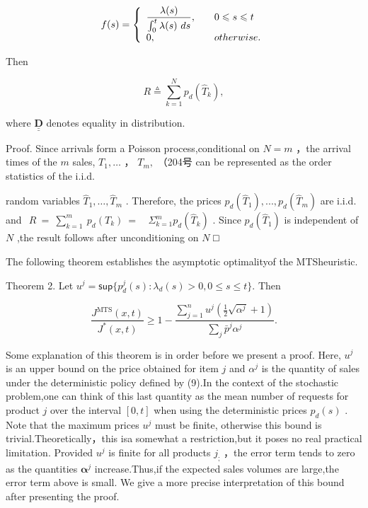 \[
f ( s ) = \left\{ \begin{array} { l l } { \displaystyle \frac { \lambda ( s ) } { \int _ { 0 } ^ { t } \lambda ( s ) ~ d s } , \quad } & { 0 \leqslant s \leqslant t } \\ { 0 , \quad } & { o t h e r w i s e . } \end{array} \right.
\]

Then

\[
R \overset { \vartriangle } { = } \sum _ { k = 1 } ^ { N } p _ { d } ( \hat { T } _ { k } ) ,
\]

where \(\underline { { \underline { { \mathbf { D } } } } }\) denotes
equality in distribution.

Proof. Since arrivals form a Poisson process,conditional on \(N = m\)
，the arrival times of the \(m\) sales, \(T _ { 1 } , \dots\) ，
\(T _ { m } ,\) （204号 can be represented as the order statistics of
the i.i.d.

random variables \(\hat { T } _ { 1 } , \dots , \hat { T } _ { m }\) .
Therefore, the prices
\(p _ { d } ( \hat { T } _ { 1 } ) , . . . , p _ { d } ( \hat { T } _ { m } )\)
are i.i.d. and
\(\begin{array} { r } { R \ = \ \sum _ { k = 1 } ^ { m } \ p _ { d } ( T _ { k } ) \ = \ } \end{array}\)
\(\Sigma _ { k = 1 } ^ { m } p _ { d } ( \hat { T } _ { k } )\) . Since
\(p _ { d } ( \hat { T } _ { 1 } )\) is independent of \(N\) ,the result
follows after unconditioning on \(N\) □

The following theorem establishes the asymptotic optimalityof the
MTSheuristic.

Theorem 2. Let
\(u ^ { j } = \mathsf { s u p } \{ p _ { d } ^ { j } ( s ) \colon \lambda _ { d } ( s ) > 0 , 0 \leqslant s \leqslant t \} .\)
Then

\[
\frac { J ^ { \mathrm { M T S } } ( x , t ) } { J ^ { * } ( x , t ) } \geqslant 1 - \frac { \sum _ { j = 1 } ^ { n } u ^ { j } ( \frac { 1 } { 2 } \sqrt { \alpha ^ { j } } + 1 ) } { \sum _ { j } \bar { p } ^ { j } \alpha ^ { j } } .
\]

Some explanation of this theorem is in order before we present a proof.
Here, \(u ^ { j }\) is an upper bound on the price obtained for item
\(j\) and \(\alpha ^ { j }\) is the quantity of sales under the
deterministic policy defined by (9).In the context of the stochastic
problem,one can think of this last quantity as the mean number of
requests for product \(j\) over the interval \([ 0 , t ]\) when using
the deterministic prices \(p _ { d } ( s )\) . Note that the maximum
prices \(u ^ { j }\) must be finite, otherwise this bound is
trivial.Theoretically，this isa somewhat a restriction,but it poses no
real practical limitation. Provided \(u ^ { j }\) is finite for all
products \(j _ { ; }\) ，the error term tends to zero as the quantities
\(\boldsymbol { \alpha } ^ { j }\) increase.Thus,if the expected sales
volumes are large,the error term above is small. We give a more precise
interpretation of this bound after presenting the proof.

